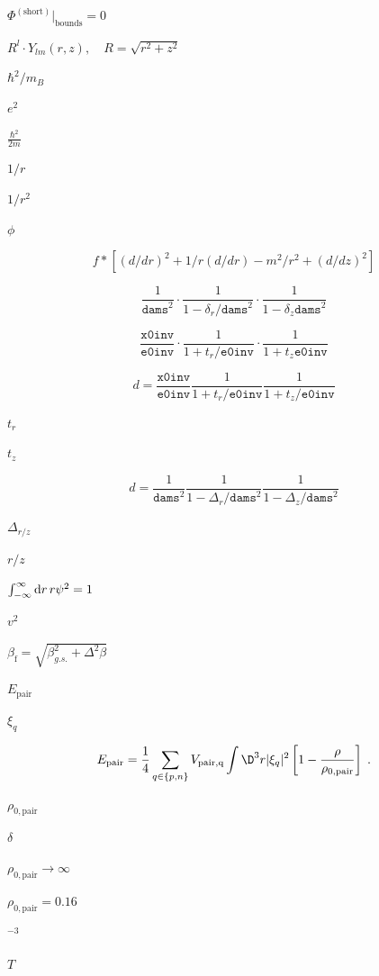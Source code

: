 \documentclass{article}
\begin{document}
$\Phi^\mathrm{(short)} \big|_\mathrm{bounds}=0$
\pagebreak

$ R^l\cdot Y_{lm}(r,z),\quad R=\sqrt{r^2+z^2} $
\pagebreak

$ \hbar^2/m_B $
\pagebreak

$ e^2 $
\pagebreak

$ \frac{\hbar^2}{2m} $
\pagebreak

$ 1/r$
\pagebreak

$ 1/r^2$
\pagebreak

$\phi$
\pagebreak

\[ f*[(d/dr)^2 + 1/r (d/dr) - m^2/r^2 + (d/dz)^2] \]
\pagebreak

\[ \frac{1}{\texttt{dams}^2} \cdot \frac{1}{1-\delta_r/\texttt{dams}^2} \cdot \frac{1}{1-\delta_z\texttt{dams}^2} \]
\pagebreak

\[ \frac{\texttt{x0inv}}{\texttt{e0inv}} \cdot \frac{1}{1+t_r/\texttt{e0inv}} \cdot \frac{1}{1+t_z\texttt{e0inv}} \]
\pagebreak

\[ d=\frac{\texttt{x0inv}}{\texttt{e0inv}}\frac{1}{1+t_r/\texttt{e0inv}} \frac{1}{1+t_z/\texttt{e0inv}} \]
\pagebreak

$ t_r $
\pagebreak

$t_z$
\pagebreak

\[ d=\frac{1}{\texttt{dams}^2}\frac{1}{1-\Delta_r/\texttt{dams}^2} \frac{1}{1-\Delta_z/\texttt{dams}^2} \]
\pagebreak

$\Delta_{r/z}$
\pagebreak

$r/z$
\pagebreak

$ \int_{-\infty}^\infty {\rm d}r\, r \psi^2 = 1 $
\pagebreak

$ v^2 $
\pagebreak

$\beta_\mathrm{f}=\sqrt{\beta_{g.s.}^2+\Delta^2\beta}$
\pagebreak

$ E_\mathrm{pair} $
\pagebreak

$ \xi_q $
\pagebreak

\[ E_{\rm pair} = \frac{1}{4} \sum_{q\in\{p,n\}}V_\mathrm{pair,q} \int \D^3r |\xi_q|^2 \left[1 -\frac{\rho}{\rho_{0,\mathrm{pair}}}\right]\;. \]
\pagebreak

$ \rho_{0,\mathrm{pair}} $
\pagebreak

$ \delta $
\pagebreak

$ \rho_{0,\mathrm{pair}}\longrightarrow\infty $
\pagebreak

$ \rho_{0,\mathrm{pair}}=0.16 $
\pagebreak

$ ^{-3} $
\pagebreak

$ T $
\pagebreak
\end{document}
